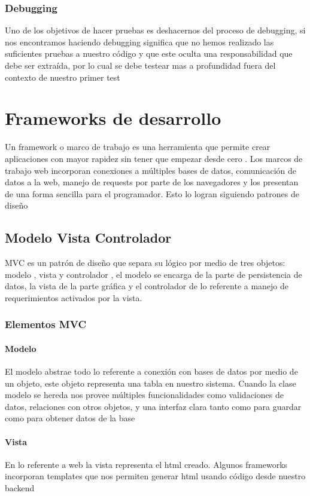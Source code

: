 \subsubsection{Debugging}
Uno de los objetivos de hacer pruebas es deshacernos
del proceso de debugging, si nos encontramos haciendo debugging significa que
no hemos realizado las suficientes pruebas a nuestro código y que este oculta
una responsabilidad que debe ser extraída, por lo cual se debe testear mas a
profundidad fuera del contexto de nuestro primer test

\section{Frameworks de desarrollo}
Un framework o marco de trabajo es una herramienta que permite crear
aplicaciones con mayor rapidez sin tener que empezar desde cero . Los marcos de
trabajo web incorporan conexiones a múltiples bases de datos, comunicación de
datos a la web, manejo de requests por parte de los navegadores y los presentan
de una forma sencilla para el programador. Esto lo logran siguiendo patrones de
diseño

\subsection{Modelo Vista Controlador}
MVC es un patrón de diseño que separa su lógico por medio de tres objetos:
modelo , vista y controlador , el modelo se encarga de la parte de persistencia
de datos, la vista de la parte gráfica y el controlador de lo referente a
manejo de requerimientos activados por la vista.

\subsubsection{Elementos MVC}

\paragraph{Modelo}
El modelo abstrae todo lo referente a conexión con bases
de datos por medio de un objeto, este objeto representa una tabla en nuestro
sistema. Cuando la clase modelo se hereda nos provee múltiples funcionalidades
como validaciones de datos, relaciones con otros objetos, y una interfaz clara
tanto como para guardar como para obtener datos de la base

\paragraph{Vista}
En lo referente a web la vista representa el html creado. Algunos frameworks
incorporan templates que nos permiten generar html usando código desde nuestro
backend

